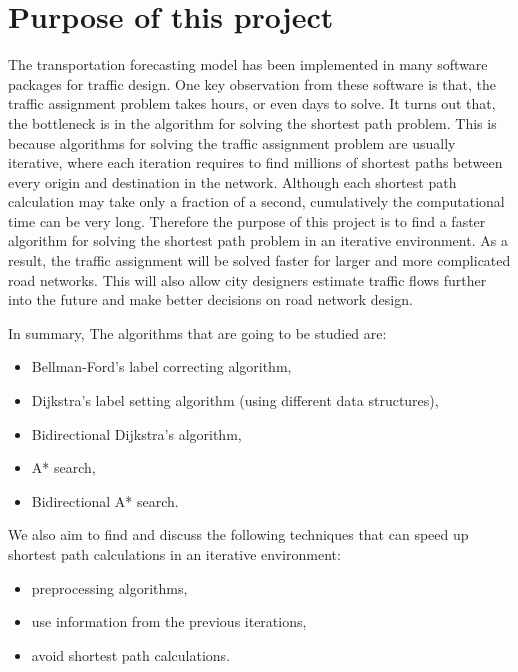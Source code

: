 \section{Purpose of this project}
The transportation forecasting model has been implemented in many software packages for traffic design.
One key observation from these software is that,
the traffic assignment problem takes hours, or even days to solve.
It turns out that,
the bottleneck is in the algorithm for solving the shortest path problem.
This is because algorithms for solving the traffic assignment problem are usually iterative,
where each iteration requires to find millions of shortest paths between every origin and destination in the network.
Although each shortest path calculation may take only a fraction of a second,
cumulatively the computational time can be very long.
Therefore the purpose of this project is to find a faster algorithm for solving the shortest path problem in an iterative environment.
As a result, the traffic assignment will be solved faster
for larger and more complicated road networks.
This will also allow city designers estimate traffic flows further into the future and make better decisions on road network design.

In summary,
The algorithms that are going to be studied are:
\begin{itemize}
    \item Bellman-Ford's label correcting algorithm,
    \item Dijkstra's label setting algorithm (using different data structures),
    \item Bidirectional Dijkstra's algorithm,
    \item A* search,
    \item Bidirectional A* search.
\end{itemize}

We also aim to find and discuss the following techniques that can speed up shortest path calculations in an iterative environment:
\begin{itemize}
    \item preprocessing algorithms,
    \item use information from the previous iterations,
    \item avoid shortest path calculations.
\end{itemize}

